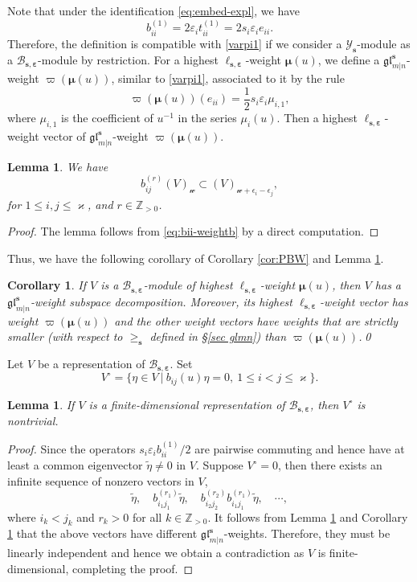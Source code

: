 \documentclass[11pt,reqno]{amsart}
\numberwithin{equation}{section}
\newtheorem{lem}[thm]{Lemma}
\newtheorem{cor}[thm]{Corollary}
\theoremstyle{definition}
\theoremstyle{remark}
\newcommand{\beq}{\begin{equation}}
\newcommand{\eeq}{\end{equation}}
\newcommand{\Z}{\mathbb{Z}}
\newcommand{\mc}{\mathcal}
\newcommand{\bZ}{\mathbb{Z}}
\newcommand{\tl}{\tilde}
\newcommand{\gge}{\geqslant}
\newcommand{\lle}{\leqslant}
\newcommand{\glMN}{\mathfrak{gl}_{m|n}^{\bm s}}
\newcommand{\YMN}{{\mathscr{Y}_{\bm s}}}
\newcommand{\BMN}{{\mathscr{B}_{\bm s,\bm \ve}}}
\newcommand{\ka}{\varkappa}
\newcommand{\ve}{\varepsilon}
\newcommand{\s}{{\bm s}}
\begin{document}
Note that under the identification \eqref{eq:embed-expl}, we have
\[
b_{ii}^{(1)}=2\ve_i t_{ii}^{(1)}=2s_i\ve_ie_{ii}.
\]
Therefore, the definition is compatible with \eqref{varpi1} if we consider a $\YMN$-module as a $\BMN$-module by restriction. For a highest $\ell_{\s,\bm \ve}$-weight $\bm\mu(u)$, we define a $\glMN$-weight $\varpi(\bm\mu(u))$, similar to \eqref{varpi1}, associated to  it by the rule
\beq\label{varpi2}
\varpi(\bm\mu(u))(e_{ii})=\frac{1}{2}s_i\ve_i\mu_{i,1},
\eeq
where $\mu_{i,1}$ is the coefficient of $u^{-1}$ in the series $\mu_i(u)$. Then a highest $\ell_{\s,\bm\ve}$-weight vector of $\glMN$-weight $\varpi(\bm\mu(u))$.

\begin{lem}\label{lem:wt-changeb}
We have
\[
b_{ij}^{(r)}(V)_{\mc w}\subset (V)_{\mc w+\epsilon_i-\epsilon_j},
\]
for $1\lle i, j\lle \ka$, and $r\in\bZ_{>0}$.
\end{lem}
\begin{proof}
The lemma follows from \eqref{eq:bii-weightb} by a direct computation.
\end{proof}

Thus, we have the following corollary of Corollary \ref{cor:PBW} and Lemma \ref{lem:wt-changeb}.
\begin{cor}\label{cor:wt-changeb}
If $V$ is a $\BMN$-module of highest $\ell_{\s,\bm\ve}$-weight $\bm\mu(u)$, then $V$ has a $\glMN$-weight subspace decomposition. Moreover, its highest $\ell_{\s,\bm\ve}$-weight vector has weight $\varpi(\bm\mu(u))$ and the other weight vectors have weights that are strictly smaller (with respect to $\gge_{\s}$ defined in \S \ref{sec glmn}) than $\varpi(\bm\mu(u))$.\qed
\end{cor}


Let $V$ be a representation of $\BMN$. Set
$$
V^\circ=\{\eta\in V~|~b_{ij}(u)\eta=0,\ 1\lle i<j\lle \ka\}.
$$
\begin{lem}\label{lem:nontrivial}
If $V$ is a finite-dimensional representation of $\BMN$, then $V^\circ$ is nontrivial.
\end{lem}
\begin{proof}
Since the operators $s_i\ve_ib_{ii}^{(1)}/2$ are pairwise commuting and hence have at least a common eigenvector $\tl\eta\ne 0$ in $V$. Suppose $V^\circ=0$, then there exists an infinite sequence of nonzero vectors in $V$,
\[
\tl\eta,\quad b_{i_1j_1}^{(r_1)}\tl\eta,\quad b_{i_2j_2}^{(r_2)}b_{i_1j_1}^{(r_1)}\tl\eta,\quad \cdots,
\]
where $i_k<j_k$ and $r_k>0$ for all $k\in \Z_{>0}$. It follows from Lemma \ref{lem:wt-changeb} and Corollary \ref{cor:wt-changeb} that the above vectors have different $\glMN$-weights. Therefore, they must be linearly independent and hence we obtain a contradiction as $V$ is finite-dimensional, completing the proof.
\end{proof}
\end{document}
